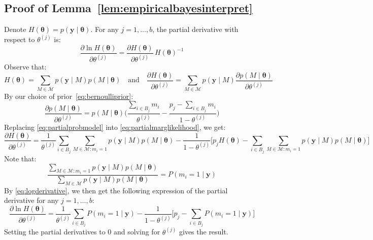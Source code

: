 \documentclass[aos]{imsart}
\theoremstyle{plain}
\newcommand{\M}{\mathcal{M}}
\newcommand{\bs}{\boldsymbol}
\begin{document}
\subsection{Proof of Lemma~\ref{lem:empiricalbayesinterpret}}
Denote $H(\bs \theta)=p(\bs y \mid \bs \theta)$. For any $j=1,\ldots,b$, the partial derivative with respect to $\theta^{(j)}$ is:
    \begin{equation}\label{eq:logderivative}
        \frac{\partial \ln H(\bs \theta)}{\partial \theta^{(j)}}=\frac{\partial H(\bs \theta)}{\partial \theta^{(j)}}\,H(\boldsymbol{\theta})^{-1}
    \end{equation}
    Observe that:
    \begin{equation}\label{eq:partialmarglikelihood}
    H(\bs \theta)=\sum_{M \in \M}p(\bs y \mid M)p(M \mid \bs \theta)
    \quad \text{and}\quad 
    \frac{\partial H(\bs \theta)}{\partial \theta^{(j)}}=\sum_{M\in \M}p(\bs y \mid M)\frac{\partial p(M \mid \bs \theta)}{\partial \theta^{(j)}}
    \end{equation}
    By our choice of prior~\eqref{eq:bernoulliprior}:
    \begin{equation}\label{eq:partialprobmodel}
    \frac{\partial p(M \mid \bs \theta)}{\partial \theta^{(j)}}= p(M \mid \bs \theta) \bigg(\frac{\sum_{i\in B_j}m_i}{\theta^{(j)}}-\frac{p_j-\sum_{i\in B_j}m_i}{1-\theta^{(j)}} \bigg)        
    \end{equation}
    Replacing \eqref{eq:partialprobmodel} into \eqref{eq:partialmarglikelihood}, we get:
    \begin{equation*}\label{eq:partialmarglikelihood2}
        \frac{\partial H(\bs \theta)}{\partial \theta^{(j)}}=\frac{1}{\theta^{(j)}}\sum_{i \in B_j}\sum_{M\in \M: m_i=1}p(\bs y \mid M)p(M \mid \bs \theta) - \frac{1}{1-\theta^{(j)}}\bigg[p_j H(\bs \theta)-\sum_{i \in B_j}\sum_{M\in \M: m_i=1}p(\bs y \mid M)p(M \mid \bs \theta)
        \bigg]
    \end{equation*}
    Note that:
    $$\frac{\sum_{M\in \M: m_i=1}p(\bs y \mid M)p(M \mid \bs \theta)}{\sum_{M\in \M}p(\bs y \mid M)p(M \mid \bs \theta)} = P(m_i = 1\mid \bs y)$$
    By \eqref{eq:logderivative}, we then get the following expression of the partial derivative for any $j=1,\ldots,b$:
    $$\frac{\partial \ln H(\bs \theta)}{\partial \theta^{(j)}}=\frac{1}{\theta^{(j)}}\sum_{i \in B_j}P(m_i = 1\mid \bs y) - \frac{1}{1-\theta^{(j)}}\bigg[p_j-\sum_{i \in B_j}P(m_i = 1\mid \bs y)
        \bigg]$$
    Setting the partial derivatives to 0 and solving for $\theta^{(j)}$ gives the result.
\end{document}
